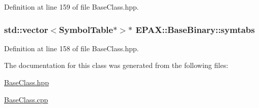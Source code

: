 \-Definition at line 159 of file \-Base\-Class.\-hpp.

\hypertarget{class_e_p_a_x_1_1_base_binary_ab2b5f8e146dba5f2f0ff32e34b6712bd}{
\subsubsection[{symtabs}]{\setlength{\rightskip}{0pt plus 5cm}std\-::vector$<${\bf \-Symbol\-Table}$\ast$$>$$\ast$ {\bf \-E\-P\-A\-X\-::\-Base\-Binary\-::symtabs}}}\label{class_e_p_a_x_1_1_base_binary_ab2b5f8e146dba5f2f0ff32e34b6712bd}


\-Definition at line 158 of file \-Base\-Class.\-hpp.



\-The documentation for this class was generated from the following files\-:\begin{DoxyCompactItemize}
\item 
\hyperlink{_base_class_8hpp}{\-Base\-Class.\-hpp}\item 
\hyperlink{_base_class_8cpp}{\-Base\-Class.\-cpp}\end{DoxyCompactItemize}
